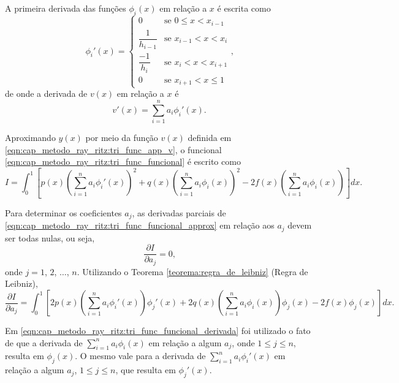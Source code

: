 \documentclass[
	12pt,				%
	openright,			%
    twoside,			%
	a4paper,			%
	english,			%
	french,				%
	spanish,			%
	brazil				%
	]{abntex2}
\numberwithin{lema}{chapter}
\numberwithin{teorema}{chapter}
\numberwithin{definicao}{chapter}
\numberwithin{exemplo}{chapter}
\numberwithin{figure}{chapter}
\begin{document}
A primeira derivada das funções $\phi_i(x)$ em relação a $x$ é escrita como
\begin{equation}
	\label{eqn:cap_metodo_ray_ritz:tri_func_phi_diff}
	\phi_i ' (x) = 
		\begin{cases}
			0 							& \mbox{se } 0 \leqslant x < x_{i - 1}\\[5pt]
			\dfrac{1}{h_{i-1}} 			& \mbox{se } x_{i-1} < x < x_i\\[10pt]
			\dfrac{-1}{h_i}				& \mbox{se } x_i < x < x_{i+1}\\[5pt]
			0							& \mbox{se } x_{i+1}<x\leqslant 1
		\end{cases}
	\text{,}
\end{equation}
de onde a derivada de $v(x)$ em relação a $x$ é
\begin{equation}
	v'(x)=\sum_{i=1}^{n} a_i \phi_i '(x)
	\text{.}
\end{equation}

Aproximando $y(x)$ por meio da função $v(x)$ definida em \eqref{eqn:cap_metodo_ray_ritz:tri_func_app_v}, o funcional \eqref{eqn:cap_metodo_ray_ritz:tri_func_funcional} é escrito como
\begin{equation}
	\label{eqn:cap_metodo_ray_ritz:tri_func_funcional_approx}
	I = \int_{0}^{1} \left [
		p(x) \left (
			\sum_{i=1}^{n} a_i \phi_i '(x)
		\right )^2
		+ q(x) \left (
			\sum_{i=1}^{n} a_i \phi_i (x)
		\right )^2
		- 2f(x) \left (
			\sum_{i=1}^{n} a_i \phi_i (x)
		\right )
	\right ] dx
	\text{.}
\end{equation}

Para determinar os coeficientes $a_j$, as derivadas parciais de \eqref{eqn:cap_metodo_ray_ritz:tri_func_funcional_approx} em relação aos $a_j$ devem ser todas nulas, ou seja,
$$
	\frac{\partial I}{\partial a_j} = 0
	\text{,}
$$
onde $j=1$, $2$, $\dots$, $n$. Utilizando o Teorema \ref{teorema:regra_de_leibniz} (Regra de Leibniz),
\begin{equation}
	\label{eqn:cap_metodo_ray_ritz:tri_func_funcional_derivada}
	\frac{\partial I}{\partial a_j} = 
	\int_{0}^{1} \left [
		2p(x) \left (
			\sum_{i=1}^{n} a_i \phi_i'(x)
		\right ) \phi_j'(x)
		+ 2q(x) \left (
			\sum_{i=1}^{n} a_i \phi_i(x)
		\right ) \phi_j(x)
		- 2f(x)\phi_j(x)
	\right ] dx
	\text{.}
\end{equation}

Em \eqref{eqn:cap_metodo_ray_ritz:tri_func_funcional_derivada} foi utilizado o fato de que a derivada de $\displaystyle \sum_{i=1}^{n} a_i \phi_i(x)$ em relação a algum $a_j$, onde $1\leqslant j\leqslant n$, resulta em $\phi_j(x)$. O mesmo vale para a derivada de $\displaystyle \sum_{i=1}^{n} a_i \phi_i'(x)$ em relação a algum $a_j$, $1\leqslant j\leqslant n$, que resulta em $\phi_j'(x)$.
\end{document}
